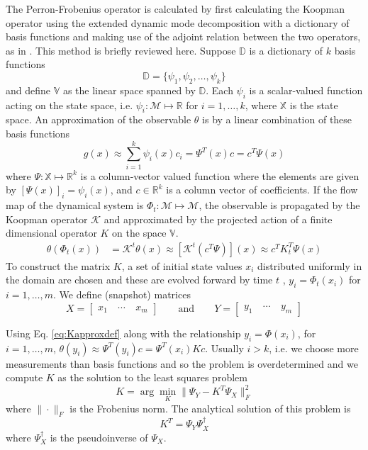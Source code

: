 \documentclass[pdflatex,sn-mathphys]{sn-jnl}%
\newcommand{\RR}{\mathbb{R}}
\newcommand{\XX}{\mathbb{X}}
\newcommand{\DD}{\mathbb{D}}
\newcommand{\VV}{\mathbb{V}}
\newcommand{\K}{\mathcal{K}}
\theoremstyle{thmstyleone}%
\theoremstyle{thmstyletwo}%
\theoremstyle{thmstylethree}%
\begin{document}
The Perron-Frobenius operator is calculated by first calculating the Koopman operator using the extended dynamic mode decomposition with a dictionary of basis functions and making use of the adjoint relation between the two operators, as in \cite{klus_jcd_2016}. This method is briefly reviewed here. Suppose  $\DD$ is a dictionary of  $k$ basis functions 
\[
\DD = \{\psi_1, \psi_2, \dots, \psi_k\}
\]
and define $\VV$ as the linear space spanned by $\DD$.  Each $\psi_i$ is a scalar-valued function acting on the state space, i.e. $\psi_i:\mathcal{M} \mapsto\RR$ for $i = 1, \dots, k$, where $\XX$ is the state space. An approximation of the observable $\theta$ is by a linear combination of these basis functions 
\begin{equation}
g(x) \approx \sum_{i = 1}^k \psi_i(x)c_i = \Psi^T(x) c = c^T\Psi(x)
\end{equation}
where $\Psi:\XX\mapsto\RR^k$ is a column-vector valued function where the elements are given by $[\Psi(x)]_i = \psi_i(x)$, and $c\in\RR^k$ is a column vector of coefficients. If the flow map of the dynamical system is $\Phi_t:\mathcal{M} \mapsto \mathcal{M} $, the observable is propagated by the Koopman operator $\mathcal{K}$ and approximated by the projected action of a finite dimensional operator $K$ on the space $\VV $.
\begin{align}
\theta(\Phi_t(x)) &= \K^t \theta(x) \approx [\K^t(c^T\Psi)](x) \approx c^TK_t^T\Psi(x)
\label{eq:Kapproxdef}
\end{align}
To construct the matrix $K$, a set of initial state values $x_i$ distributed uniformly in the domain are chosen and these are evolved forward by time $t$ , $y_i = \Phi_t(x_i)$ for $i = 1, \dots, m$.  We define (snapshot) matrices 
\begin{equation*}
X = 
\begin{bmatrix} 
x_1 & ~\cdots~ & x_m 
\end{bmatrix}
\qquad 
\text{and} 
\qquad 
Y = 
\begin{bmatrix} 
y_1 & ~\cdots~ & y_m 
\end{bmatrix}
\end{equation*}

Using Eq. \eqref{eq:Kapproxdef} along with the relationship $y_i = \Phi(x_i)$, for $i = 1, \dots, m$, $\theta(y_i) \approx \Psi^T(y_i) c = \Psi^T(x_i) K c$. Usually $i>k$, i.e. we choose more measurements than basis functions and so the problem is overdetermined and we compute $K$ as the solution to the least squares problem 
\begin{equation}
    K = \arg \min_K \|\Psi_Y - K^T\Psi_X\|^2_F
\end{equation}
where $\|\cdot\|_F$ is the Frobenius norm.  The analytical solution of this problem is 
\begin{equation}
    K^T = \Psi_Y\Psi_X^\dagger
\end{equation}
where $\Psi_X^\dagger$ is the pseudoinverse of $\Psi_X$.
\end{document}
